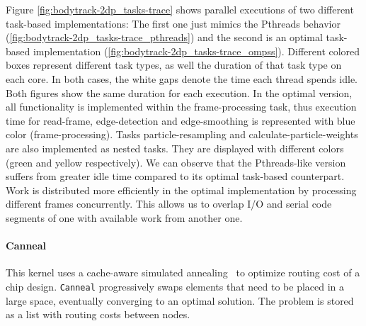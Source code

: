 {Figure \ref{fig:bodytrack-2dp_tasks-trace} shows parallel executions of two different task-based implementations: 
The first one just mimics the Pthreads behavior (\ref{fig:bodytrack-2dp_tasks-trace_pthreads}) and the second is an optimal task-based implementation (\ref{fig:bodytrack-2dp_tasks-trace_ompss}).  
Different colored boxes represent different task types, as well the duration of that task type on each core. In both cases, the white gaps denote the time each thread spends idle.  
Both figures show the same duration for each execution. In the optimal version, all functionality is implemented within the frame-processing task, thus 
execution time for read-frame, edge-detection and edge-smoothing is represented with blue color (frame-processing).  
Tasks particle-resampling and calculate-particle-weights are also implemented as nested tasks. 
They are displayed with different colors (green and yellow respectively).  
We can observe that the Pthreads-like version suffers
from greater idle time compared to its optimal task-based counterpart. 
Work is distributed more efficiently in the optimal implementation
by processing different frames concurrently. 
This allows us to overlap I/O and serial code segments of one with available work from another one.
       

\paragraph{\textbf{Canneal}}
This kernel uses a cache-aware simulated annealing~\cite{Banerjee:1994:PAV:185340} to
optimize routing cost of a chip design.  \texttt{Canneal} progressively swaps elements
that need to be placed in a large space, eventually converging to an optimal solution. The
problem is stored as a list with routing costs between nodes. 

}
